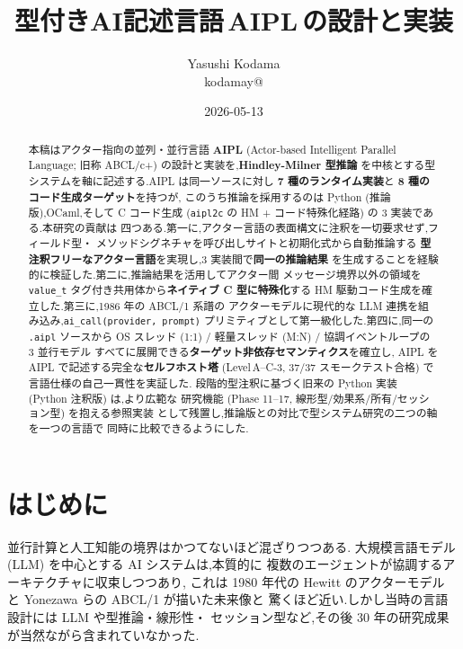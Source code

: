 \documentclass[11pt,a4paper]{article}
\title{\bfseries 型付きAI記述言語\,AIPL\,の設計と実装}
\author{Yasushi Kodama \\ {\small kodamay@}}
\date{2026-05-13}
\newcommand{\code}[1]{\texttt{\small #1}}
\begin{document}
\maketitle

\begin{abstract}
本稿はアクター指向の並列・並行言語 \textbf{AIPL} (Actor-based Intelligent
Parallel Language; 旧称 ABCL/c+) の設計と実装を,\textbf{Hindley-Milner 型推論}
を中核とする型システムを軸に記述する.AIPL は同一ソースに対し
\textbf{7 種のランタイム実装}と \textbf{8 種のコード生成ターゲット}を持つが,
このうち推論を採用するのは Python (推論版),OCaml,そして C コード生成
(\code{aipl2c} の HM + コード特殊化経路) の 3 実装である.本研究の貢献は
四つある.第一に,アクター言語の表面構文に注釈を一切要求せず,フィールド型・
メソッドシグネチャを呼び出しサイトと初期化式から自動推論する
\textbf{型注釈フリーなアクター言語}を実現し,3 実装間で\textbf{同一の推論結果}
を生成することを経験的に検証した.第二に,推論結果を活用してアクター間
メッセージ境界以外の領域を \code{value\_t} タグ付き共用体から\textbf{ネイティブ
C 型に特殊化}する HM 駆動コード生成を確立した.第三に,1986 年の ABCL/1 系譜の
アクターモデルに現代的な LLM 連携を組み込み,\code{ai\_call(provider,~prompt)}
プリミティブとして第一級化した.第四に,同一の \code{.aipl} ソースから
OS スレッド (1:1) / 軽量スレッド (M:N) / 協調イベントループの 3 並行モデル
すべてに展開できる\textbf{ターゲット非依存セマンティクス}を確立し,
AIPL を AIPL で記述する完全な\textbf{セルフホスト塔} (Level\,A--C-3,
37/37 スモークテスト合格) で言語仕様の自己一貫性を実証した.
段階的型注釈に基づく旧来の Python 実装 (Python 注釈版) は,より広範な
研究機能 (Phase 11--17, 線形型/効果系/所有/セッション型) を抱える参照実装
として残置し,推論版との対比で型システム研究の二つの軸を一つの言語で
同時に比較できるようにした.
\end{abstract}

\tableofcontents

\section{はじめに}

並行計算と人工知能の境界はかつてないほど混ざりつつある.
大規模言語モデル (LLM) を中心とする AI システムは,本質的に
複数のエージェントが協調するアーキテクチャに収束しつつあり,
これは 1980 年代の Hewitt のアクターモデル \cite{hewitt1973} と
Yonezawa らの ABCL/1 \cite{yonezawa1986abcl} が描いた未来像と
驚くほど近い.しかし当時の言語設計には LLM や型推論・線形性・
セッション型など,その後 30 年の研究成果が当然ながら含まれていなかった.
\end{document}
